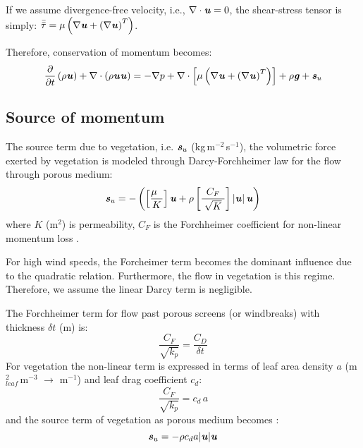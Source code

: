 \begin{assumption}
	If we assume divergence-free velocity, i.e., $\nabla \cdot \textbf{\textit{u}} = 0$, the shear-stress tensor is simply: $\bar{\bar{{\tau}}} = \mu \left( \nabla \textbf{\textit{u}} + \left(\nabla \textbf{\textit{u}} \right)^T \right)$.
\end{assumption}

Therefore, conservation of momentum becomes:
\begin{equation}
\frac{\partial}{\partial t} \left(\rho \textbf{\textit{u}} \right) + \nabla \cdot \left(\rho \textbf{\textit{u}}\textbf{\textit{u}} \right) = - \nabla p + \nabla \cdot \left[ \mu \left( \nabla \textbf{\textit{u}} + \left(\nabla \textbf{\textit{u}} \right)^T \right) \right] +  \rho \textbf{\textit{g}} +  \textbf{\textit{s}}_{u}
\end{equation}

\subsection{Source of momentum}

The source term due to vegetation, i.e. $\textbf{\textit{s}}_u$ (kg\,m$^{-2}$\,s$^{-1}$), the volumetric force exerted by vegetation is modeled through Darcy-Forchheimer law for the flow through porous medium:
\begin{equation}
\textbf{\textit{s}}_u =  - \left( {\left[ {\frac{{{\mu}\;\;}}{K}} \right]{\textbf{\textit{u}}} + {\rho}\left[ {\frac{{{C_F}}}{{\;\sqrt K \;}}} \right]\left| {\textbf{\textit{u}}} \right|{\textbf{\textit{u}}}} \right)
\label{eq:darcyforchheimer}
\end{equation}
where $K$ (m$^{2}$) is permeability, $C_F$ is the Forchheimer coefficient for non-linear momentum loss \citep{Verboven2006,Boulard2008}.

\begin{assumption}
	For high wind speeds, the Forcheimer term becomes the dominant influence due to the quadratic relation. Furthermore, the flow in vegetation is this regime. Therefore, we assume the linear Darcy term is negligible. 
\end{assumption}

The Forchheimer term for flow past porous screens (or windbreaks) with thickness $\delta t$ (m) is: 
\begin{equation}
\frac{{{C_F}}}{{\sqrt {{k_p}} }} = \frac{{{C_D}}}{{\delta t}}
\end{equation}
For vegetation the non-linear term is expressed in terms of leaf area density $a$ (m$^2_{\textit{leaf}}$\,m$^{-3}$ $\rightarrow$ m$^{-1}$) and leaf drag coefficient $c_d$:
\begin{equation}
\frac{{{C_F}}}{{\sqrt {{k_p}} }} = c_d\,a
\end{equation}
and the source term of vegetation as porous medium becomes \citep{Wilson1977,Liu1996,Hiraoka2005,Kenjeres2013}:
\begin{equation}
\textbf{\textit{s}}_u = - \rho c_d a |\textbf{\textit{u}}| \textbf{\textit{u}}
\end{equation}

